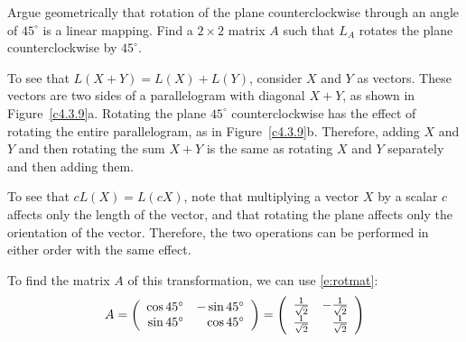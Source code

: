 \documentclass{ximera}
\begin{document}
\begin{exercise} \label{c4.3.9}
Argue geometrically that rotation of the plane counterclockwise
through an angle of $45^\circ$ is a linear mapping.  Find a
$2\times 2$ matrix $A$ such that $L_A$ rotates the plane
counterclockwise by $45^\circ$.

\begin{solution}

To see that $L(X + Y) = L(X) + L(Y)$, consider $X$ and $Y$ as
vectors.  These vectors are two sides of a parallelogram with
diagonal $X + Y$, as shown in Figure~\ref{c4.3.9}a.  Rotating
the plane $45^\circ$ counterclockwise has the effect of
rotating the entire parallelogram, as in Figure~\ref{c4.3.9}b.
Therefore, adding $X$ and $Y$ and then rotating the sum
$X + Y$ is the same as rotating $X$ and $Y$ separately and
then adding them.

\para To see that $cL(X) = L(cX)$, note that multiplying a
vector $X$ by a scalar $c$ affects only the length of the vector,
and that rotating the plane affects only the orientation of
the vector.  Therefore, the two operations can be performed in
either order with the same effect.

\para To find the matrix $A$ of this transformation, we can use
\eqref{e:rotmat}:
\[ A = \left(\begin{array}{rr} \cos 45^\circ & -\sin 45^\circ\\ \sin 45^\circ &\cos 45^\circ\end{array}\right)
= \left(\begin{array}{rr} \frac{1}{\sqrt{2}} & -\frac{1}{\sqrt{2}}\\ \frac{1}{\sqrt{2}} &\frac{1}{\sqrt{2}}\end{array}\right) \]

\begin{figure}[htb]
                       \centerline{%
                       }
\end{figure}

\end{solution}
\end{exercise}
\end{document}
